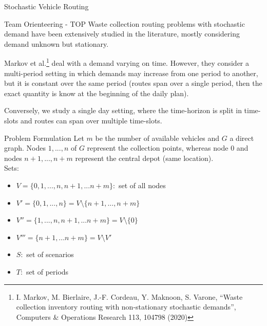 \documentclass{beamer} %
\theoremstyle{definition} %
\begin{document}
    \begin{frame}{Stochastic Vehicle Routing}
  	\begin{block}{Team Orienteering - TOP}
  	Waste collection routing problems with stochastic demand have been extensively	studied in the literature, mostly considering demand unknown but stationary. 
  	
  	Markov et al.\footnote{ I. Markov, M. Bierlaire, J.-F. Cordeau, Y. Maknoon, S. Varone, ``Waste collection inventory	routing with non-stationary stochastic demands'', Computers \& Operations Research 113, 104798 (2020)} deal with a demand varying on time. However, they consider a multi-period setting in which demands
  	may increase from one period to another, but it is constant over the same period (routes span over a single period, then the exact quantity is know at the beginning of the daily plan). 
  	
  	Conversely, we study a single day setting, where the time-horizon is
  	split in time-slots and routes can span over multiple time-slots. 
  	\end{block}
  \end{frame}
  

\begin{frame}{Problem Formulation}
Let $m$ be the number of available vehicles and $G$ a direct graph. Nodes $1,...,n$ of $G$ represent the collection points, whereas node $0$ and nodes $n+1,...,n+m$ represent the central depot (same location). 
\vspace{0.2cm}\\
Sets:
\begin{itemize}
	\item $V=\{0,1,...,n,n+1,...n+m\}:$ set of all nodes
	\item $V'=\{0,1,...,n\}=V\setminus\{n+1,...,n+m\}$ 
	\item $V''=\{1,...,n,n+1,...n+m\}=V\setminus\{0\}$ 
	\item $V'''=\{n+1,...n+m\}=V\setminus V'$ 
	\item $S:$ set of scenarios
	\item $T:$ set of periods
\end{itemize}
	
\end{frame}
\end{document}

